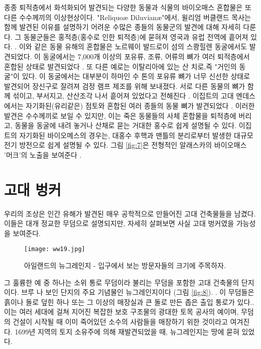 \documentclass[10pt,twocolumn,letterpaper]{article}
\begin{document}
종종 퇴적층에서 화석화되어 발견되는 다양한 동물과 식물의 바이오매스 혼합물은 또 다른 수수께끼의 이상현상이다. "Reliquoæ Diluvianæ"에서, 윌리엄 버클랜드 목사는 함께 발견된 이유를 설명하기 어려운 수많은 종들의 동물군의 발견에 대해 자세히 다룬다. 그 동물군들은 홍적층(홍수로 인한 퇴적층)에 묻혀져 영국과 유럽 전역에 흩어져 있다. \cite{58}. 이와 같은 동물 유해의 혼합물은 노르웨이 발드로이 섬의 스쾅힐렌 동굴에서도 발견되었다. 이 동굴에서는 7,000개 이상의 포유류, 조류, 어류의 뼈가 여러 퇴적층에서 혼합된 상태로 발견되었다 \cite{59}. 또 다른 예로는 이탈리아에 있는 산 치로,즉 "거인의 동굴"이 있다. 이 동굴에서는 대부분이 하마인 수 톤의 포유류 뼈가 너무 신선한 상태로 발견되어 장신구로 잘려져 검정 램프 제조를 위해 보내졌다. 서로 다른 동물의 뼈가 함께 섞이고, 부서지고, 산산조각 나서 흩어져 있었다고 전해진다 \cite{60,61}. 이집트의 고대 멘데스에서는 자기화된(유리같은) 점토와 혼합된 여러 종들의 동물 뼈가 발견되었다 \cite{57}. 이러한 발견은 수수께끼로 보일 수 있지만, 이는 죽은 동물들의 사체 혼합물을 퇴적층에 버리고, 동물을  동굴에 내려 놓거나 산채로 묻는 거대한 홍수로 쉽게 설명될 수 있다. 이집트의 자기화된 바이오메스의 경우는,  대홍수 후핵과 맨틀의 분리로부터 발생한 대규모 전기 방전으로 쉽게 설명될 수 있다. 그림 \ref{fig:7}은 전형적인 알래스카의 바이오매스 '머크'의 노출을 보여준다 \cite{56}.

\section{고대 벙커}

우리의 조상은 인간 유해가 발견된 매우 공학적으로 만들어진 고대 건축물들을 남겼다. 이들은 대개 정교한 무덤으로 설명되지만, 자세히 살펴보면 사실 고대 벙커였을 가능성을 보여준다.

\begin{figure}[b]
\begin{center}
   \texttt{[image: ww19.jpg]}
\end{center}
   \caption{아일랜드의 뉴그레인지 - 입구에서 보는 방문자들의 크기에 주목하자.}
\label{fig:8}
\label{fig:onecol}
\end{figure}

그 훌륭한 예 중 하나는 소위 통로 무덤이라 불리는 무덤을 포함한 고대 건축물의 단지이다. 브루 나 보인 단지의 주요 기념물인 뉴그레인지이다 (그림 \ref{fig:8}). . 이 무덤들은 흙이나 돌로 덮힌 하나 또는 그 이상의 매장실과  큰 돌로 만든 좁은 출입 통로가 있다.\cite{70}. 이는 여러 세대에 걸쳐 지어진 복잡한 보호 구조물의 광대한 토목 공사의 예이며, 무덤의 건설이 시작될 때 이미 죽어있던 소수의 사람들을 매장하기 위한 것이라고 여겨진다. 1699년 지역의 토지 소유주에 의해 재발견되었을 때, 뉴그레인지는 땅에 묻혀 있었다.
\end{document}
